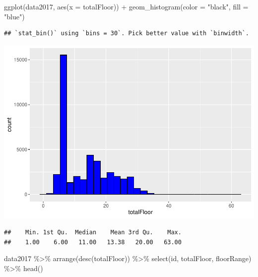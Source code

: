 \documentclass[
]{article}
\newenvironment{Shaded}{\begin{snugshade}}{\end{snugshade}}
\newcommand{\AttributeTok}[1]{\textcolor[rgb]{0.77,0.63,0.00}{#1}}
\newcommand{\FunctionTok}[1]{\textcolor[rgb]{0.00,0.00,0.00}{#1}}
\newcommand{\NormalTok}[1]{#1}
\newcommand{\SpecialCharTok}[1]{\textcolor[rgb]{0.00,0.00,0.00}{#1}}
\newcommand{\StringTok}[1]{\textcolor[rgb]{0.31,0.60,0.02}{#1}}
\begin{document}
\begin{Shaded}
\begin{Highlighting}[]
\FunctionTok{ggplot}\NormalTok{(data2017, }\FunctionTok{aes}\NormalTok{(}\AttributeTok{x =}\NormalTok{ totalFloor)) }\SpecialCharTok{+} \FunctionTok{geom\_histogram}\NormalTok{(}\AttributeTok{color =} \StringTok{"black"}\NormalTok{, }\AttributeTok{fill =} \StringTok{"blue"}\NormalTok{) }
\end{Highlighting}
\end{Shaded}

\begin{verbatim}
## `stat_bin()` using `bins = 30`. Pick better value with `binwidth`.
\end{verbatim}

\includegraphics{Project_files/figure-latex/unnamed-chunk-11-1.pdf}

\begin{Shaded}
\end{Shaded}

\begin{verbatim}
##    Min. 1st Qu.  Median    Mean 3rd Qu.    Max. 
##    1.00    6.00   11.00   13.38   20.00   63.00
\end{verbatim}

\begin{Shaded}
\begin{Highlighting}[]
\NormalTok{data2017 }\SpecialCharTok{\%\textgreater{}\%} \FunctionTok{arrange}\NormalTok{(}\FunctionTok{desc}\NormalTok{(totalFloor)) }\SpecialCharTok{\%\textgreater{}\%} \FunctionTok{select}\NormalTok{(id, totalFloor, floorRange) }\SpecialCharTok{\%\textgreater{}\%} \FunctionTok{head}\NormalTok{()}
\end{Highlighting}
\end{Shaded}
\end{document}
